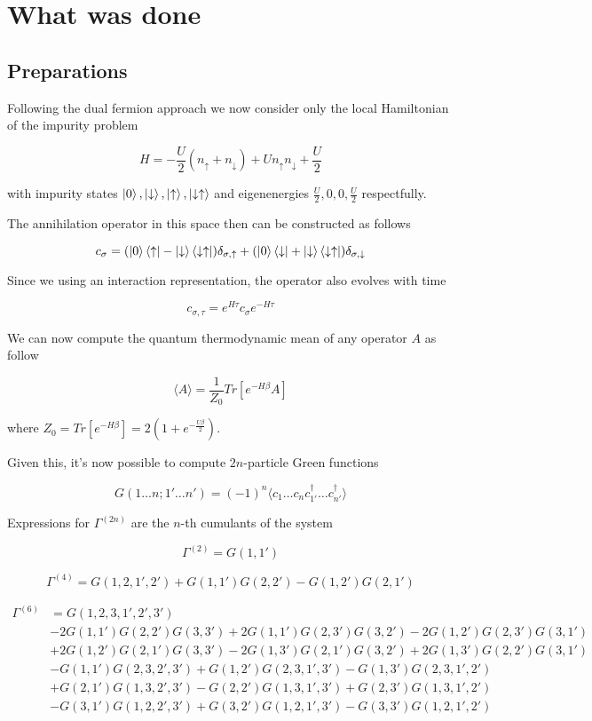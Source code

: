 \section{What was done}
\subsection{Preparations}
Following the dual fermion approach we now consider only the local Hamiltonian of the impurity problem

\[ H = -\frac{U}{2} \left(n_{\uparrow}+n_{\downarrow}\right) + U n_{\uparrow} n_{\downarrow} + \frac{U}{2} \]

with impurity states $\ket{0},\ket{\downarrow},\ket{\uparrow},\ket{\downarrow\uparrow}$ and eigenenergies $\frac{U}{2},0,0,\frac{U}{2}$ respectfully.

The annihilation operator in this space then can be constructed as follows

\[ c_\sigma =  	(\ket{0}\bra{\uparrow}-\ket{\downarrow}\bra{\downarrow\uparrow})\delta_{\sigma,\uparrow}
	+	(\ket{0}\bra{\downarrow}+\ket{\downarrow}\bra{\downarrow\uparrow})\delta_{\sigma,\downarrow} \]

Since we using an interaction representation, the operator also evolves with time

\[ c_{\sigma,\tau} = e^{H\tau}c_\sigma e^{-H\tau} \]

We can now compute the quantum thermodynamic mean of any operator $A$ as follow

\[ \langle A\rangle = \frac{1}{Z_0}Tr[e^{-H\beta}A] \]

where $Z_0 = Tr[e^{-H\beta}] = 2(1+e^{-\frac{U\beta}{2}})$.

Given this, it's now possible to compute $2n$-particle Green functions

\[ G(1\dots n;1'\dots n') = (-1)^n \langle c_1\dots c_n c_{1'}^\dagger\dots c_{n'}^\dagger\rangle\]

Expressions for $\Gamma^{(2n)}$ are the $n$-th cumulants of the system

\[ \Gamma^{(2)} = G(1, 1') \]

\[ \Gamma^{(4)} = G(1,2,1',2')+G(1,1')G(2,2')-G(1,2')G(2,1')\]

\begin{align*}
\Gamma^{(6)} & = G(1, 2, 3, 1', 2', 3') \\
& -2 G(1, 1') G(2, 2') G(3, 3') 
+2 G(1, 1') G(2, 3') G(3, 2')
-2 G(1, 2') G(2, 3') G(3, 1') \\ 
& +2 G(1, 2') G(2, 1') G(3, 3')
-2 G(1, 3') G(2, 1') G(3, 2')
+2 G(1, 3') G(2, 2') G(3, 1') \\
& -G(1, 1') G(2, 3, 2', 3')
+G(1, 2') G(2, 3, 1', 3')
-G(1, 3') G(2, 3, 1', 2') \\
& +G(2, 1') G(1, 3, 2', 3')
-G(2, 2') G(1, 3, 1', 3')
+G(2, 3') G(1, 3, 1', 2') \\
& -G(3, 1') G(1, 2, 2', 3')
+G(3, 2') G(1, 2, 1', 3')
-G(3, 3') G(1, 2, 1', 2')
\end{align*}

